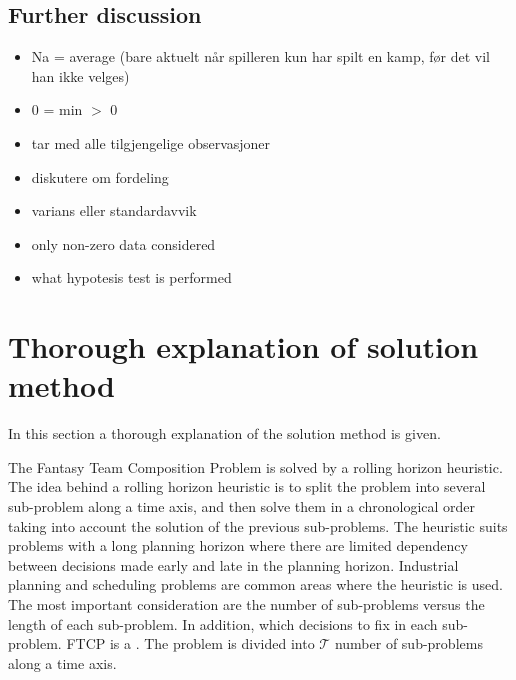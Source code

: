 \subsection{Further discussion}
\begin{itemize}
    \item Na = average (bare aktuelt når spilleren kun har spilt en kamp, før det vil han ikke velges) 
    \item 0 = min $>$ 0
    \item tar med alle tilgjengelige observasjoner
    \item diskutere om fordeling
    \item varians eller standardavvik
    \item only non-zero data considered
    \item what hypotesis test is performed
\end{itemize}


\section{Thorough explanation of solution method}

In this section a thorough explanation of the solution method is given. 

\newpar


The Fantasy Team Composition Problem is solved by a rolling horizon heuristic. The idea behind a rolling horizon heuristic is to split the problem into several sub-problem along a time axis, and then solve them in a chronological order taking into account the solution of the previous sub-problems. The heuristic suits problems with a long planning horizon where there are limited dependency between decisions made early and late in the planning horizon. Industrial planning and scheduling problems are common areas where the heuristic is used. The most important consideration are the number of sub-problems versus the length of each sub-problem. In addition, which decisions to fix in each sub-problem. FTCP is a . The problem is divided into $\mathcal{T}$ number of sub-problems along a time axis. 

